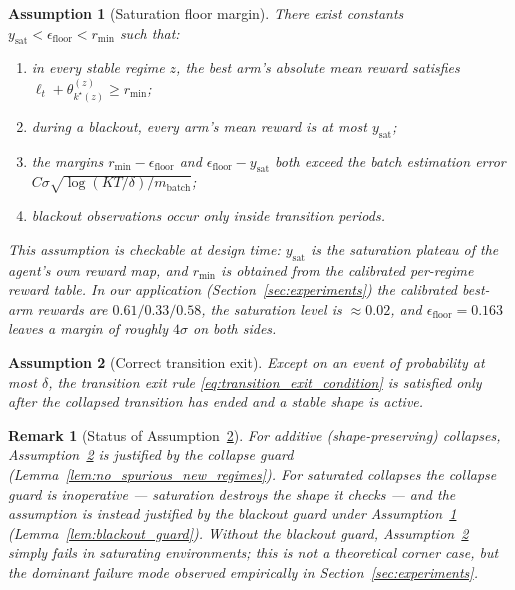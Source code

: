 \documentclass[11pt]{article}
\newtheorem{assumption}{Assumption}
\newtheorem{remark}{Remark}
\begin{document}
\begin{assumption}[Saturation floor margin]
\label{ass:saturation_floor}
There exist constants $y_{\mathrm{sat}}<\epsilon_{\mathrm{floor}}<r_{\min}$ such that:
\begin{enumerate}
\item in every stable regime $z$, the best arm's absolute mean reward satisfies $\ell_t+\theta^{(z)}_{k^\star(z)}\geq r_{\min}$;
\item during a blackout, every arm's mean reward is at most $y_{\mathrm{sat}}$;
\item the margins $r_{\min}-\epsilon_{\mathrm{floor}}$ and $\epsilon_{\mathrm{floor}}-y_{\mathrm{sat}}$ both exceed the batch estimation error $C\sigma\sqrt{\log(KT/\delta)/m_{\mathrm{batch}}}$;
\item blackout observations occur only inside transition periods.
\end{enumerate}
This assumption is checkable at design time: $y_{\mathrm{sat}}$ is the saturation plateau of the agent's own reward map, and $r_{\min}$ is obtained from the calibrated per-regime reward table. In our application (Section~\ref{sec:experiments}) the calibrated best-arm rewards are $0.61/0.33/0.58$, the saturation level is $\approx 0.02$, and $\epsilon_{\mathrm{floor}}=0.163$ leaves a margin of roughly $4\sigma$ on both sides.
\end{assumption}

\begin{assumption}[Correct transition exit]
\label{ass:correct_exit}
Except on an event of probability at most $\delta$, the transition exit rule \eqref{eq:transition_exit_condition} is satisfied only after the collapsed transition has ended and a stable shape is active.
\end{assumption}

\begin{remark}[Status of Assumption~\ref{ass:correct_exit}]
For additive (shape-preserving) collapses, Assumption~\ref{ass:correct_exit} is justified by the collapse guard (Lemma~\ref{lem:no_spurious_new_regimes}). For saturated collapses the collapse guard is inoperative --- saturation destroys the shape it checks --- and the assumption is instead justified by the blackout guard under Assumption~\ref{ass:saturation_floor} (Lemma~\ref{lem:blackout_guard}). Without the blackout guard, Assumption~\ref{ass:correct_exit} simply \emph{fails} in saturating environments; this is not a theoretical corner case, but the dominant failure mode observed empirically in Section~\ref{sec:experiments}.
\end{remark}
\end{document}
